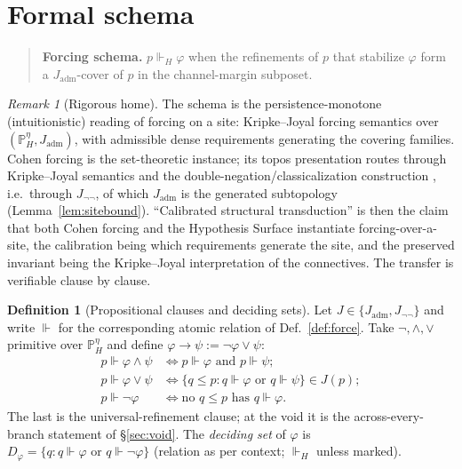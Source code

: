 \documentclass[11pt]{article}
\theoremstyle{definition}
\newtheorem{definition}{Definition}
\theoremstyle{remark}
\newtheorem*{remark}{Remark}
\newcommand{\forcesH}{\Vdash_{H}}
\newcommand{\PHeta}{\mathbb{P}_{H}^{\eta}}
\newcommand{\refines}{\leq}
\newcommand{\Jadm}{J_{\mathrm{adm}}}
\newcommand{\Jnn}{J_{\neg\neg}}
\begin{document}
\section{Formal schema}\label{sec:schema}

\begin{quote}
\textbf{Forcing schema.} $p\forcesH\varphi$ when the refinements of $p$ that stabilize $\varphi$
form a $\Jadm$-cover of $p$ in the channel-margin subposet.
\end{quote}

\begin{remark}[Rigorous home]
The schema is the persistence-monotone (intuitionistic) reading of forcing on a site: Kripke--Joyal
forcing semantics over $(\PHeta,\Jadm)$, with admissible dense requirements generating the covering
families. Cohen forcing is the set-theoretic instance; its topos presentation routes through
Kripke--Joyal semantics and the double-negation/classicalization construction \cite{maclane-moerdijk},
i.e.\ through $\Jnn$, of which $\Jadm$ is the generated subtopology (Lemma~\ref{lem:sitebound}).
``Calibrated structural transduction'' is then the claim that both Cohen forcing and the Hypothesis
Surface instantiate forcing-over-a-site, the calibration being which requirements generate the site,
and the preserved invariant being the Kripke--Joyal interpretation of the connectives. The transfer is
verifiable clause by clause.
\end{remark}

\begin{definition}[Propositional clauses and deciding sets]\label{def:clauses}
Let $J\in\{\Jadm,\Jnn\}$ and write $\Vdash$ for the corresponding atomic relation of
Def.~\ref{def:force}. Take $\neg,\wedge,\vee$ primitive over $\PHeta$ and define
$\varphi\to\psi:=\neg\varphi\vee\psi$:
\begin{align*}
p\Vdash\varphi\wedge\psi &\iff p\Vdash\varphi \text{ and } p\Vdash\psi;\\
p\Vdash\varphi\vee\psi &\iff \{q\refines p: q\Vdash\varphi \text{ or } q\Vdash\psi\}\in J(p);\\
p\Vdash\neg\varphi &\iff \text{no } q\refines p \text{ has } q\Vdash\varphi.
\end{align*}
The last is the universal-refinement clause; at the void it is the across-every-branch statement of
\S\ref{sec:void}. The \emph{deciding set} of $\varphi$ is
$D_\varphi=\{q: q\Vdash\varphi \text{ or } q\Vdash\neg\varphi\}$ (relation as per context;
$\forcesH$ unless marked).
\end{definition}
\end{document}
